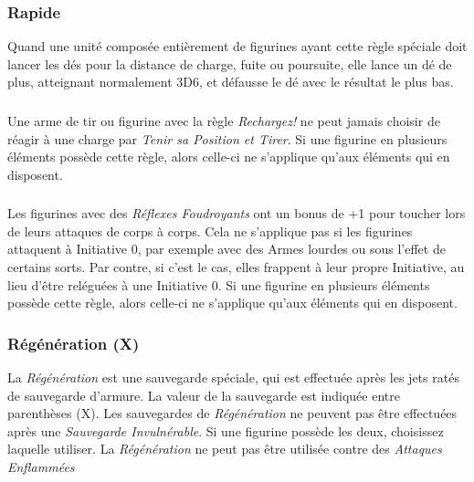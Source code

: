 \subsubsection*{Rapide}

Quand une unité composée entièrement de figurines ayant cette règle spéciale doit lancer les dés pour la distance de charge, fuite ou poursuite, elle lance un dé de plus, atteignant normalement 3D6, et défausse le dé avec le résultat le plus bas.

\subsubsection*{}

Une arme de tir ou figurine avec la règle \emph{Rechargez!} ne peut jamais choisir de réagir à une charge par \emph{Tenir sa Position et Tirer}. Si une figurine en plusieurs éléments possède cette règle, alors celle-ci ne s'applique qu'aux éléments qui en disposent.

\subsubsection*{}

Les figurines avec des \emph{Réflexes Foudroyants} ont un bonus de +1 pour toucher lors de leurs attaques de corps à corps. Cela ne s'applique pas si les figurines attaquent à Initiative 0, par exemple avec des Armes lourdes ou sous l'effet de certains sorts. Par contre, si c'est le cas, elles frappent à leur propre Initiative, au lieu d'être reléguées à une Initiative 0. Si une figurine en plusieurs éléments possède cette règle, alors celle-ci ne s'applique qu'aux éléments qui en disposent.

\subsubsection*{Régénération (X)}

La \emph{Régénération} est une sauvegarde spéciale, qui est effectuée après les jets ratés de sauvegarde d'armure. La valeur de la sauvegarde est indiquée entre parenthèses (X). Les sauvegardes de \emph{Régénération} ne peuvent pas être effectuées après une \emph{Sauvegarde Invulnérable}. Si une figurine possède les deux, choisissez laquelle utiliser. La \emph{Régénération} ne peut pas être utilisée contre des \emph{Attaques Enflammées} 

